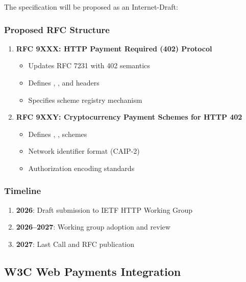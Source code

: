 The \tprotocol{} specification will be proposed as an Internet-Draft:

\subsubsection{Proposed RFC Structure}

\begin{enumerate}
    \item \textbf{RFC 9XXX: HTTP Payment Required (402) Protocol}
    \begin{itemize}
        \item Updates RFC 7231 with 402 semantics
        \item Defines , , and  headers
        \item Specifies scheme registry mechanism
    \end{itemize}

    \item \textbf{RFC 9XXY: Cryptocurrency Payment Schemes for HTTP 402}
    \begin{itemize}
        \item Defines , ,  schemes
        \item Network identifier format (CAIP-2)
        \item Authorization encoding standards
    \end{itemize}
\end{enumerate}

\subsubsection{Timeline}

\begin{enumerate}
    \item \textbf{2026}: Draft submission to IETF HTTP Working Group
    \item \textbf{2026--2027}: Working group adoption and review
    \item \textbf{2027}: Last Call and RFC publication
\end{enumerate}

\subsection{W3C Web Payments Integration}

